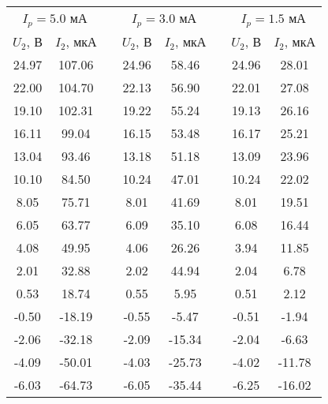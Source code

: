 \begin{table}
\centering
\begin{tabular}{|c|c|c|c|c|c|c|c|}
\cline{1-2} \cline{4-5} \cline{7-8}

\multicolumn{2}{|c|}{$I_p = 5.0$ мА} &  & \multicolumn{2}{c|}{$I_p = 3.0$ мА} &  & \multicolumn{2}{c|}{$I_p = 1.5$ мА} \\ \cline{1-2} \cline{4-5} \cline{7-8} 

$U_2$, В & $I_2$, мкА &  & $U_2$, В & $I_2$, мкА &  & $U_2$, В & $I_2$, мкА \\ 
\cline{1-2} \cline{4-5} \cline{7-8}
 
 24.97 &  107.06 & &  24.96 &  58.46 & &  24.96 &  28.01 
 \\ \cline{1-2} \cline{4-5} \cline{7-8}
 22.00 &  104.70 & &  22.13 &  56.90 & &  22.01 &  27.08 
 \\ \cline{1-2} \cline{4-5} \cline{7-8}
 19.10 &  102.31 & &  19.22 &  55.24 & &  19.13 &  26.16 
 \\ \cline{1-2} \cline{4-5} \cline{7-8}
 16.11 &   99.04 & &  16.15 &  53.48 & &  16.17 &  25.21 
 \\ \cline{1-2} \cline{4-5} \cline{7-8}
 13.04 &   93.46 & &  13.18 &  51.18 & &  13.09 &  23.96 
 \\ \cline{1-2} \cline{4-5} \cline{7-8}
 10.10 &   84.50 & &  10.24 &  47.01 & &  10.24 &  22.02 
 \\ \cline{1-2} \cline{4-5} \cline{7-8}
  8.05 &   75.71 & &   8.01 &  41.69 & &   8.01 &  19.51 
 \\ \cline{1-2} \cline{4-5} \cline{7-8}
  6.05 &   63.77 & &   6.09 &  35.10 & &   6.08 &  16.44
 \\ \cline{1-2} \cline{4-5} \cline{7-8}
  4.08 &   49.95 & &   4.06 &  26.26 & &   3.94 &  11.85
 \\ \cline{1-2} \cline{4-5} \cline{7-8}
  2.01 &   32.88 & &   2.02 &  44.94 & &   2.04 &   6.78
 \\ \cline{1-2} \cline{4-5} \cline{7-8}
  0.53 &   18.74 & &   0.55 &   5.95 & &   0.51 &   2.12
 \\ \cline{1-2} \cline{4-5} \cline{7-8}
 -0.50 &  -18.19 & &  -0.55 &  -5.47 & &  -0.51 &  -1.94
 \\ \cline{1-2} \cline{4-5} \cline{7-8}
 -2.06 &  -32.18 & &  -2.09 & -15.34 & &  -2.04 &  -6.63 
 \\ \cline{1-2} \cline{4-5} \cline{7-8}
 -4.09 &  -50.01 & &  -4.03 & -25.73 & &  -4.02 & -11.78 
 \\ \cline{1-2} \cline{4-5} \cline{7-8}
 -6.03 &  -64.73 & &  -6.05 & -35.44 & &  -6.25 & -16.02 

\end{tabular}
\end{table}

